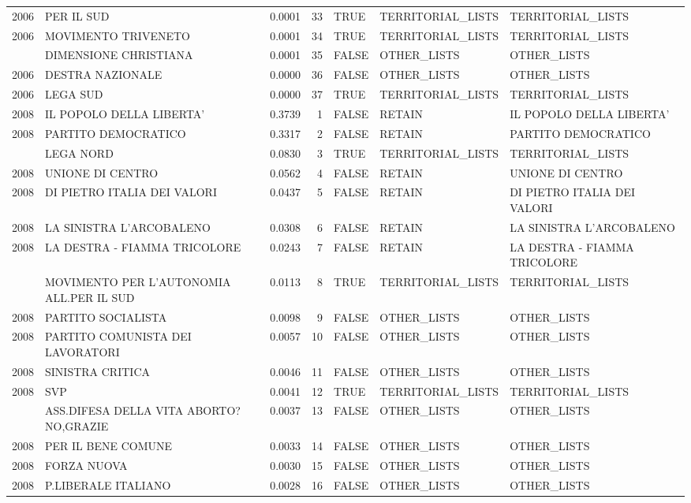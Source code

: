 \begin{longtable}[t]{rlrrlll}
2006 & PER IL SUD & 0.0001 & 33 & TRUE & TERRITORIAL\_LISTS & TERRITORIAL\_LISTS\\
2006 & MOVIMENTO TRIVENETO & 0.0001 & 34 & TRUE & TERRITORIAL\_LISTS & TERRITORIAL\_LISTS\\
\addlinespace
2006 & DIMENSIONE CHRISTIANA & 0.0001 & 35 & FALSE & OTHER\_LISTS & OTHER\_LISTS\\
2006 & DESTRA NAZIONALE & 0.0000 & 36 & FALSE & OTHER\_LISTS & OTHER\_LISTS\\
2006 & LEGA SUD & 0.0000 & 37 & TRUE & TERRITORIAL\_LISTS & TERRITORIAL\_LISTS\\
2008 & IL POPOLO DELLA LIBERTA' & 0.3739 & 1 & FALSE & RETAIN & IL POPOLO DELLA LIBERTA'\\
2008 & PARTITO DEMOCRATICO & 0.3317 & 2 & FALSE & RETAIN & PARTITO DEMOCRATICO\\
\addlinespace
2008 & LEGA NORD & 0.0830 & 3 & TRUE & TERRITORIAL\_LISTS & TERRITORIAL\_LISTS\\
2008 & UNIONE DI CENTRO & 0.0562 & 4 & FALSE & RETAIN & UNIONE DI CENTRO\\
2008 & DI PIETRO ITALIA DEI VALORI & 0.0437 & 5 & FALSE & RETAIN & DI PIETRO ITALIA DEI VALORI\\
2008 & LA SINISTRA L'ARCOBALENO & 0.0308 & 6 & FALSE & RETAIN & LA SINISTRA L'ARCOBALENO\\
2008 & LA DESTRA - FIAMMA TRICOLORE & 0.0243 & 7 & FALSE & RETAIN & LA DESTRA - FIAMMA TRICOLORE\\
\addlinespace
2008 & MOVIMENTO PER L'AUTONOMIA ALL.PER IL SUD & 0.0113 & 8 & TRUE & TERRITORIAL\_LISTS & TERRITORIAL\_LISTS\\
2008 & PARTITO SOCIALISTA & 0.0098 & 9 & FALSE & OTHER\_LISTS & OTHER\_LISTS\\
2008 & PARTITO COMUNISTA DEI LAVORATORI & 0.0057 & 10 & FALSE & OTHER\_LISTS & OTHER\_LISTS\\
2008 & SINISTRA CRITICA & 0.0046 & 11 & FALSE & OTHER\_LISTS & OTHER\_LISTS\\
2008 & SVP & 0.0041 & 12 & TRUE & TERRITORIAL\_LISTS & TERRITORIAL\_LISTS\\
\addlinespace
2008 & ASS.DIFESA DELLA VITA ABORTO?NO,GRAZIE & 0.0037 & 13 & FALSE & OTHER\_LISTS & OTHER\_LISTS\\
2008 & PER IL BENE COMUNE & 0.0033 & 14 & FALSE & OTHER\_LISTS & OTHER\_LISTS\\
2008 & FORZA NUOVA & 0.0030 & 15 & FALSE & OTHER\_LISTS & OTHER\_LISTS\\
2008 & P.LIBERALE ITALIANO & 0.0028 & 16 & FALSE & OTHER\_LISTS & OTHER\_LISTS\\

\end{longtable}
